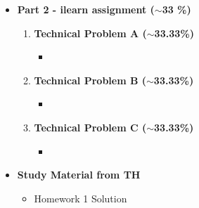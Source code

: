 \documentclass[11pt]{article}
\begin{document}
\begin{itemize}
\begin{enumerate}
		\item 
		\item \vspace{10mm}
		\item \vspace{10mm}


		
	\end{enumerate}
%
\item  \textbf{\Large Part 2 - ilearn assignment ($\sim$33 \%) }\\
\Large
	\begin{enumerate}


		\item  \textbf{\Large Technical Problem A ($\sim$33.33\%)}\\
		\begin{itemize}
			\item 
		\end{itemize}
		\item  \textbf{\Large Technical Problem B ($\sim$33.33\%)}\\
		\begin{itemize}
			\item 
		\end{itemize}
		\item  \textbf{\Large Technical Problem C ($\sim$33.33\%)}\\
		\begin{itemize}
			\item 

		\end{itemize}
	\end{enumerate}

\item  \textbf{\Large Study Material from TH}\\
\begin{itemize}

\item Homework 1 Solution


\end{itemize}

\end{itemize}


	
\end{document}
